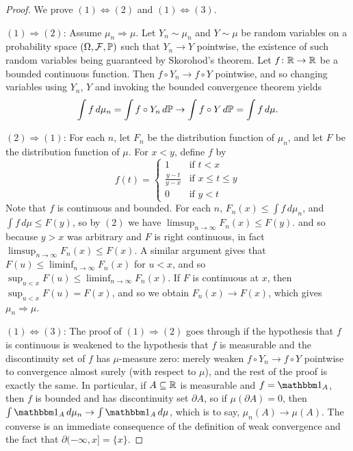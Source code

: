 \documentclass[leqno]{article}
\theoremstyle{definition}
\begin{document}
\begin{proof}
We prove $(1) \Longleftrightarrow (2)$ and $(1) \Longleftrightarrow (3)$.

$(1) \Longrightarrow (2)$: Assume $\mu_n \Rightarrow \mu$. Let $Y_n \sim \mu_n$ and $Y \sim \mu$ be random variables on a probability space $(\Omega, \mathcal F, \P)$ such that $Y_n \rightarrow Y$ pointwise, the existence of such random variables being guaranteed by Skorohod's theorem. Let $f\colon \R \rightarrow \R$ be a bounded continuous function. Then $f \circ Y_n \rightarrow f \circ Y$ pointwise, and so changing variables using $Y_n$, $Y$ and invoking the bounded convergence theorem yields
\[ \int f \, d\mu_n = \int f \circ Y_n \, d\P \rightarrow \int f \circ Y \, d\P = \int f \, d\mu. \]

$(2) \Longrightarrow (1)$: For each $n$, let $F_n$ be the distribution function of $\mu_n$, and let $F$ be the distribution function of $\mu$. For $x < y$, define $f$ by
\[ f(t) = \begin{cases} 1 & \text{if $t < x$} \\
                        \frac{y - t}{y - x} & \text{if $x \le t \le y$} \\
                        0 & \text{if $y < t$} \end{cases} \]
Note that $f$ is continuous and bounded. For each $n$, $F_n(x) \le \int f \, d\mu_n$, and $\int f \, d\mu \le F(y)$, so by $(2)$ we have $\limsup_{n \rightarrow \infty} F_n(x) \le F(y)$. and so because $y > x$ was arbitrary and $F$ is right continuous, in fact $\limsup_{n \rightarrow \infty} F_n(x) \le F(x)$. A similar argument gives that $F(u) \le \liminf_{n \rightarrow \infty} F_n(x)$ for $u < x$, and so $\sup_{u < x} F(u) \le \liminf_{n \rightarrow \infty} F_n(x)$. If $F$ is continuous at $x$, then $\sup_{u < x} F(u) = F(x)$, and so we obtain $F_n(x) \rightarrow F(x)$, which gives $\mu_n \Rightarrow \mu$.

$(1) \Longleftrightarrow (3)$: The proof of $(1) \Longrightarrow (2)$ goes through if the hypothesis that $f$ is continuous is weakened to the hypothesis that $f$ is measurable and the discontinuity set of $f$ has $\mu$-measure zero: merely weaken $f \circ Y_n \rightarrow f \circ Y$ pointwise to convergence almost surely (with respect to $\mu$), and the rest of the proof is exactly the same. In particular, if $A \subseteq \R$ is measurable and \linebreak $f = \mathbbm 1_A$, then $f$ is bounded and has discontinuity set $\partial A$, so if $\mu(\partial A) = 0$, then $\int \mathbbm 1_A \, d\mu_n \rightarrow \int \mathbbm 1_A \, d\mu$, which is to say, $\mu_n(A) \rightarrow \mu(A)$. The converse is an immediate consequence of the definition of weak convergence and the fact that $\partial (-\infty, x] = \{x\}$.
\end{proof}
\end{document}
